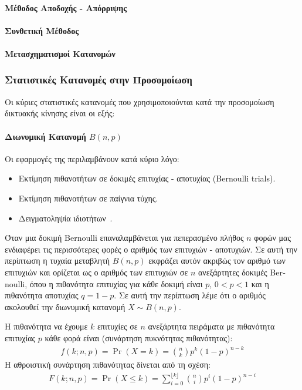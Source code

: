 \documentclass[12pt]{report}
\begin{document}
\paragraph{Μέθοδος Αποδοχής - Απόρριψης}
\paragraph{Συνθετική Μέθοδος}
\paragraph{Μετασχηματισμοί Κατανομών}

\subsubsection{Στατιστικές Κατανομές στην Προσομοίωση}
Οι κύριες στατιστικές κατανομές που χρησιμοποιούνται κατά την προσομοίωση δικτυακής κίνησης είναι οι εξής:
\paragraph{Διωνυμική Κατανομή \(B(n, p)\)} Οι εφαρμογές της περιλαμβάνουν κατά κύριο λόγο:
\begin{itemize}
  \item Εκτίμηση πιθανοτήτων σε δοκιμές επιτυχίας - αποτυχίας (\textlatin{Bernoulli trials}).
  \item Εκτίμηση πιθανοτήτων σε παίγνια τύχης.
  \item Δειγματοληψία ιδιοτήτων~\cite{book:07}.
\end{itemize}
Όταν μια δοκιμή \textlatin{Bernoulli} επαναλαμβάνεται για πεπερασμένο πλήθος \(n\) φορών μας ενδιαφέρει τις περισσότερες φορές ο αριθμός των επιτυχιών - αποτυχιών. Σε αυτή την περίπτωση η τυχαία μεταβλητή \(B(n, p)\) εκφράζει αυτόν ακριβώς τον αριθμό των επιτυχιών και ορίζεται ως ο αριθμός των επιτυχιών σε \(n\) ανεξάρτητες δοκιμές \textlatin{Bernoulli}, όπου η πιθανότητα επιτυχίας για κάθε δοκιμή είναι \(p\), \(0<p<1\) και η πιθανότητα αποτυχίας \(q=1-p\). Σε αυτή την περίπτωση λέμε ότι ο αριθμός ακολουθεί την διωνυμική κατανομή \(X \sim B(n, p)\).

Η πιθανότητα να έχουμε \(k\) επιτυχίες σε \(n\) ανεξάρτητα πειράματα με πιθανότητα επιτυχίας \(p\) κάθε φορά είναι (συνάρτηση πυκνότητας πιθανότητας):
\begin{align*}
f(k;n,p)=\Pr(X=k)={\binom {n}{k}}p^{k}(1-p)^{n-k}
\end{align*}
Η αθροιστική συνάρτηση πιθανότητας δίνεται από τη σχέση:
\begin{align*}
F(k;n,p)=\Pr(X \leq k)=\sum _{i=0}^{\lfloor k\rfloor }\binom {n}{i}p^{i}(1-p)^{n-i}
\end{align*}
\end{document}

